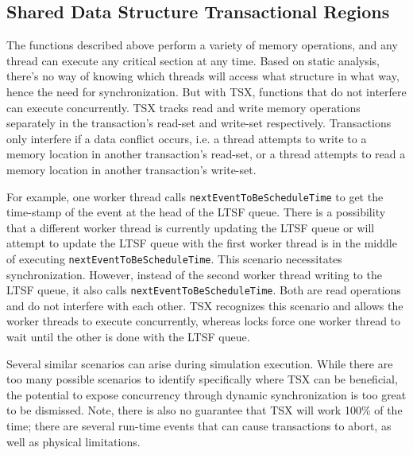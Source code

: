 \documentclass[a4paper]{article}
\begin{document}
\subsection{\textbf{Shared Data Structure Transactional Regions}}

The functions described above perform a variety of memory operations, and any
thread can execute any critical section at any time.  Based on static analysis,
there's no way of knowing which threads will access what structure in what way,
hence the need for synchronization.  But with TSX, functions that do not
interfere can execute concurrently.  TSX tracks read and write memory
operations separately in the transaction's read-set and write-set respectively.
Transactions only interfere if a data conflict occurs, i.e. a thread attempts
to write to a memory location in another transaction's read-set, or a thread
attempts to read a memory location in another transaction's write-set.
\par

For example, one worker thread calls \texttt{nextEventToBeScheduleTime} to get
the time-stamp of the event at the head of the LTSF queue.  There
is a possibility that a different worker thread is currently updating the LTSF
queue or will attempt to update the LTSF queue with the first worker thread is
in the middle of executing \texttt{nextEventToBeScheduleTime}.  This scenario
necessitates synchronization.  However, instead of the second worker thread
writing to the LTSF queue, it also calls \texttt{nextEventToBeScheduleTime}.
Both are read operations and do not interfere with each other.  TSX recognizes
this scenario and allows the worker threads to execute concurrently, whereas
locks force one worker thread to wait until the other is done with the LTSF
queue.  
\par

Several similar scenarios can arise during simulation execution. While there are
too many possible scenarios to identify specifically where TSX can be
beneficial, the potential to expose concurrency through dynamic synchronization
is too great to be dismissed. Note, there is also no guarantee that TSX will
work 100\% of the time; there are several run-time events that can cause
transactions to abort, as well as physical limitations.  
\par

\end{document}
